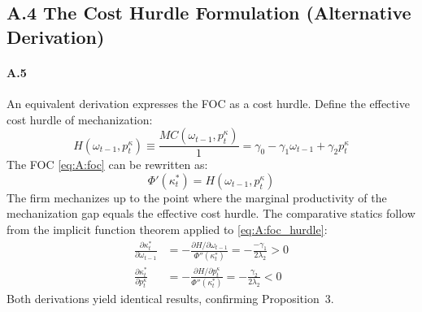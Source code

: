 \subsection*{A.4 The Cost Hurdle Formulation (Alternative
	Derivation)}

\paragraph{A.5}
An equivalent derivation expresses the FOC as a cost
hurdle. Define the effective cost hurdle of mechanization:
\begin{equation}
	H(\omega_{t-1}, p^\kappa_t)
	\equiv \frac{MC(\omega_{t-1}, p^\kappa_t)}{1}
	= \gamma_0 - \gamma_1 \omega_{t-1} + \gamma_2 p^\kappa_t
	\label{eq:A:hurdle}
\end{equation}
The FOC \eqref{eq:A:foc} can be rewritten as:
\begin{equation}
	\Phi'(\kappa_t^*) = H(\omega_{t-1}, p^\kappa_t)
	\label{eq:A:foc_hurdle}
\end{equation}
The firm mechanizes up to the point where the marginal
productivity of the mechanization gap equals the effective
cost hurdle. The comparative statics follow from the
implicit function theorem applied to
\eqref{eq:A:foc_hurdle}:
\begin{align}
	\frac{\partial \kappa_t^*}{\partial \omega_{t-1}}
	&= -\frac{\partial H / \partial \omega_{t-1}}
	{\Phi''(\kappa_t^*)}
	= -\frac{-\gamma_1}{2\lambda_2} > 0
	\label{eq:A:ift_omega} \\
	\frac{\partial \kappa_t^*}{\partial p^\kappa_t}
	&= -\frac{\partial H / \partial p^\kappa_t}
	{\Phi''(\kappa_t^*)}
	= -\frac{\gamma_2}{2\lambda_2} < 0
	\label{eq:A:ift_price}
\end{align}
Both derivations yield identical results, confirming
Proposition~3.
